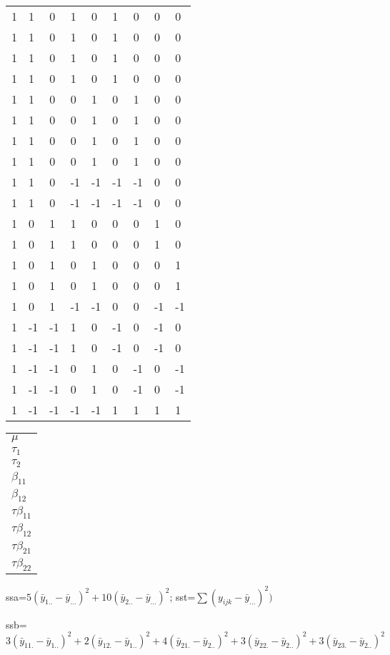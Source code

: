 \documentclass[
  10pt,
  twocolumn]{article}
\begin{document}
\begin{tabular}{l|ll|ll|llll|}
1& 1 & 0 & 1 & 0 & 1 & 0 & 0 & 0\\
1& 1 & 0 & 1 & 0 & 1 & 0 & 0 & 0\\
1& 1 & 0 & 1 & 0 & 1 & 0 & 0 & 0\\
1& 1 & 0 & 1 & 0 & 1 & 0 & 0 & 0\\\hline
1& 1 & 0 & 0 & 1 & 0 & 1 & 0 & 0\\
1& 1 & 0 & 0 & 1 & 0 & 1 & 0 & 0\\
1& 1 & 0 & 0 & 1 & 0 & 1 & 0 & 0\\
1& 1 & 0 & 0 & 1 & 0 & 1 & 0 & 0\\\hline
1& 1 & 0 &-1 &-1 &-1 &-1 & 0 & 0\\
1& 1 & 0 &-1 &-1 &-1 &-1 & 0 & 0\\\hline
1& 0 & 1 & 1 & 0 & 0 & 0 & 1 & 0\\
1& 0 & 1 & 1 & 0 & 0 & 0 & 1 & 0\\\hline
1& 0 & 1 & 0 & 1 & 0 & 0 & 0 & 1\\
1& 0 & 1 & 0 & 1 & 0 & 0 & 0 & 1\\\hline
1& 0 & 1 &-1 &-1 & 0 & 0 &-1 &-1\\\hline
1&-1 &-1 & 1 & 0 &-1 & 0 &-1 & 0\\
1&-1 &-1 & 1 & 0 &-1 & 0 &-1 & 0\\\hline
1&-1 &-1 & 0 & 1 & 0 &-1 & 0 &-1\\
1&-1 &-1 & 0 & 1 & 0 &-1 & 0 &-1\\\hline
1&-1 &-1 &-1 &-1 & 1 & 1 & 1 & 1\\
\end{tabular}
\begin{tabular}{|l|}
$\mu$\\
$\tau_{1}$\\
$\tau_{2}$\\
$\beta_{11}$\\
$\beta_{12}$\\
$\tau\beta_{11}$\\
$\tau\beta_{12}$\\
$\tau\beta_{21}$\\
$\tau\beta_{22}$\\
\end{tabular}

ssa=\(5(\bar y_{1..}-\bar y_{...})^2+10(\bar y_{2..}-\bar y_{...})^2\);
sst=\(\sum( y_{ijk}-\bar y_{...})^2)\)

ssb=\(3(\bar y_{11.}-\bar y_{1..})^2+2(\bar y_{12.}-\bar y_{1..})^2+4(\bar y_{21.}-\bar y_{2..})^2+3(\bar y_{22.}-\bar y_{2..})^2+3(\bar y_{23.}-\bar y_{2..})^2\)
\end{document}
